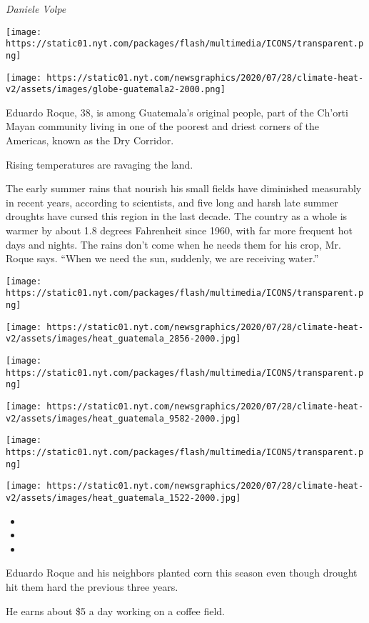 \emph{Daniele Volpe}

\texttt{[image: https://static01.nyt.com/packages/flash/multimedia/ICONS/transparent.png]}

\texttt{[image: https://static01.nyt.com/newsgraphics/2020/07/28/climate-heat-v2/assets/images/globe-guatemala2-2000.png]}

Eduardo Roque, 38, is among Guatemala's original people, part of the
Ch'orti Mayan community living in one of the poorest and driest corners
of the Americas, known as the Dry Corridor.

Rising temperatures are ravaging the land.

The early summer rains that nourish his small fields have diminished
measurably in recent years, according to scientists, and five long and
harsh late summer droughts have cursed this region in the last decade.
The country as a whole is warmer by about 1.8 degrees Fahrenheit since
1960, with far more frequent hot days and nights. The rains don't come
when he needs them for his crop, Mr. Roque says. ``When we need the sun,
suddenly, we are receiving water.''

\texttt{[image: https://static01.nyt.com/packages/flash/multimedia/ICONS/transparent.png]}

\texttt{[image: https://static01.nyt.com/newsgraphics/2020/07/28/climate-heat-v2/assets/images/heat\_guatemala\_2856-2000.jpg]}

\texttt{[image: https://static01.nyt.com/packages/flash/multimedia/ICONS/transparent.png]}

\texttt{[image: https://static01.nyt.com/newsgraphics/2020/07/28/climate-heat-v2/assets/images/heat\_guatemala\_9582-2000.jpg]}

\texttt{[image: https://static01.nyt.com/packages/flash/multimedia/ICONS/transparent.png]}

\texttt{[image: https://static01.nyt.com/newsgraphics/2020/07/28/climate-heat-v2/assets/images/heat\_guatemala\_1522-2000.jpg]}

\begin{itemize}
\item
\item
\item
\end{itemize}

Eduardo Roque and his neighbors planted corn this season even though
drought hit them hard the previous three years.

He earns about \$5 a day working on a coffee field.

